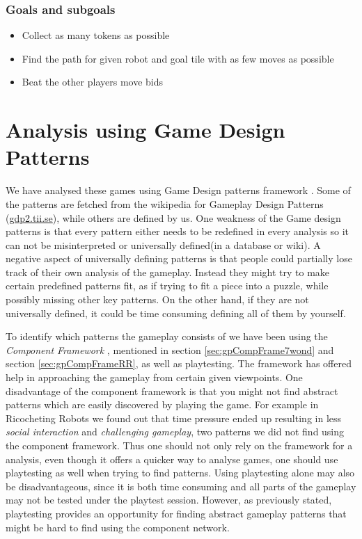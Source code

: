 \documentclass[a4paper]{article}
\begin{document}
\subsubsection{Goals and subgoals}
\begin{itemize}[noitemsep,topsep=0pt,parsep=0pt,partopsep=0pt]
  \item Collect as many tokens as possible
  \item Find the path for given robot and goal tile with as few moves as possible
  \item Beat the other players move bids
\end{itemize}

\section{Analysis using Game Design Patterns}
\label{sec:GDP}

We have analysed these games using Game Design patterns framework \cite{Bjork2003}.
Some of the patterns are fetched from the wikipedia for Gameplay Design Patterns (\url{gdp2.tii.se}), while others are defined by us.
One weakness of the Game design patterns is that every pattern either needs to be redefined in every analysis so it can not be misinterpreted or universally defined(in a database or wiki).
A negative aspect of universally defining patterns is that people could partially lose track of their own analysis of the gameplay.
Instead they might try to make certain predefined patterns fit, as if trying to fit a piece into a puzzle, while possibly missing other key patterns.
On the other hand, if they are not universally defined, it could be time consuming defining all of them by yourself. 

To identify which patterns the gameplay consists of we have been using the \textit{Component Framework} \cite{bjork2003describing}, mentioned in section \ref{sec:gpCompFrame7wond} and section \ref{sec:gpCompFrameRR}, as well as playtesting. 
The framework has offered help in approaching the gameplay from certain given viewpoints. 
One disadvantage of the component framework is that you might not find abstract patterns which are easily discovered by playing the game. For example in Ricocheting Robots we found out that time pressure ended up resulting in less \textit{social interaction} and \textit{challenging gameplay}, 
two patterns we did not find using the component framework. Thus one should not only rely on the framework for a analysis, even though it offers a quicker way to analyse games, one should use playtesting as well when trying to find patterns. 
Using playtesting alone may also be disadvantageous, since it is both time consuming and all parts of the gameplay may not be tested under the playtest session.
However, as previously stated, playtesting provides an opportunity for finding abstract gameplay patterns that might be hard to find using the component network.
\end{document}
